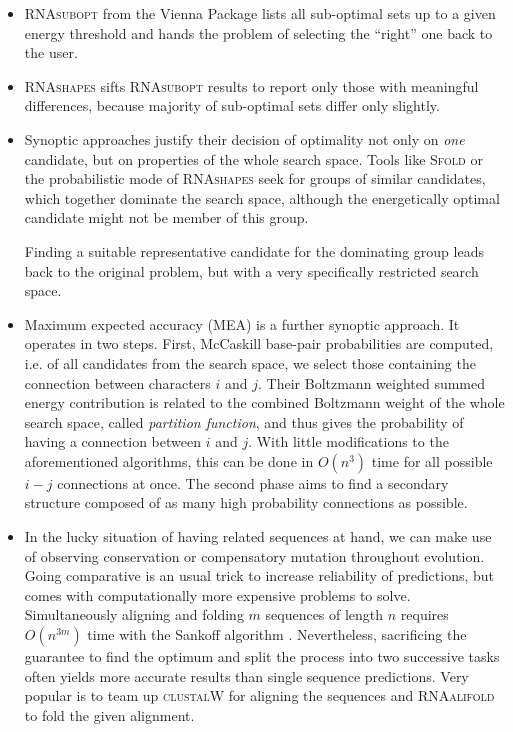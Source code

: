 \documentclass[paper=a4,fontsize=12pt]{scrartcl}
\newcommand{\progname}[1]{\mbox{\textsc{#1}}\xspace}
\def\rnasubopt{\progname{RNAsubopt}}
\def\rnashapes{\progname{RNAshapes}}
\def\sfold{\progname{Sfold}}
\def\clustalw{\progname{clustalW}}
\def\rnaalifold{\progname{RNAalifold}}
\begin{document}
\begin{itemize}
	\item{\rnasubopt from the Vienna Package \cite{LOR:BER:HOE:TAF:FLA:STA:HOF:2011} lists all sub-optimal sets up to a given energy threshold and hands the problem of selecting the ``right'' one back to the user.}
	\item{\rnashapes \cite{GIE:VOSS:REH:2004} sifts \rnasubopt results to report only those with meaningful differences, because majority of sub-optimal sets differ only slightly.}
	\item{Synoptic approaches justify their decision of optimality not only on \emph{one} candidate, but on properties of the whole search space. Tools like \sfold \cite{CHA:LAW:DIN:2005} or the probabilistic mode of \rnashapes \cite{JAN:GIE:2010} seek for groups of similar candidates, which together dominate the search space, although the energetically optimal candidate might not be member of this group.
	
	Finding a suitable representative candidate for the dominating group leads back to the original problem, but with a very specifically restricted search space.}
	\item{Maximum expected accuracy (MEA) is a further synoptic approach. It operates in two steps. First, McCaskill base-pair probabilities are computed, i.e. of all candidates from the search space, we select those containing the connection between characters $i$ and $j$. Their Boltzmann weighted summed energy contribution is related to the combined Boltzmann weight of the whole search space, called \emph{partition function}, and thus gives the probability of having a connection between $i$ and $j$. With little modifications to the aforementioned algorithms, this can be done in $O(n^3)$ time for all possible $i-j$ connections at once. The second phase aims to find a secondary structure composed of as many high probability connections as possible.}
	\item{In the lucky situation of having related sequences at hand, we can make use of observing conservation or compensatory mutation throughout evolution. Going comparative is an usual trick to increase reliability of predictions, but comes with computationally more expensive problems to solve. Simultaneously aligning and folding $m$ sequences of length $n$ requires $O(n^{3m})$ time with the Sankoff algorithm \cite{SAN:1985}. Nevertheless, sacrificing the guarantee to find the optimum and split the process into two successive tasks often yields more accurate results than single sequence predictions. Very popular is to team up \clustalw \cite{THO:HIG:GIB:1994} for aligning the sequences and \rnaalifold \cite{BER:HOF:WIL:GRU:STA:2008} to fold the given alignment.}
\end{itemize}
\end{document}
